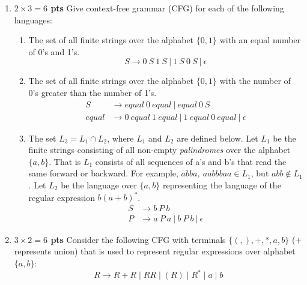 \documentclass[10pt]{article}
\newcommand {\pts}[1]{{\bf #1 pts}}
\begin{document}
\begin{enumerate}

\item  \pts{$2\times 3= 6$} Give context-free grammar (CFG) for each of the following languages:
    \begin{enumerate}
           \item The set of all finite strings over the alphabet $\{0,1\}$ with an equal number of 0's and 1's.
            \[
            S \rightarrow 0\ S\ 1\ S\ |\ 1\ S\ 0\ S\ |\  \epsilon
            \]
           \item The set of all finite strings over the alphabet $\{0,1\}$ with the number of 0's greater than the number of 1's.
           \begin{align*}
               S       &\rightarrow equal\ 0\ equal\ |\  equal\ 0\ S\\
               equal   &\rightarrow 0\ equal\ 1\ equal\
                        |\ 1\ equal\ 0\ equal\
                        |\ \epsilon
           \end{align*}
           \item The set $L_3=L_1\cap L_2$, where $L_1$ and $L_2$ are defined below.
           Let $L_1$ be the finite strings consisting of all non-empty \emph{palindromes} over the alphabet $\{a,b\}$. That is $L_1$
           consists of all sequences of a's and b's that read the same forward or backward. For example, $abba,~aabbbaa\in L_1$, but $abb\not\in L_1$.
           Let $L_2$ be the language over  $\{a,b\}$ representing the language of the regular expression $b(a+b)^\ast$.
           \begin{align*}
               S    &\rightarrow b\ P\ b \\
               P    &\rightarrow a\ P\ a\ |\ b\ P\ b\ |\ \epsilon
           \end{align*}
    \end{enumerate}

\newpage

\item \pts{$3\times 2= 6$} Consider the following CFG with terminals $\{(,),+,*,a,b\}$ ($+$ represents union) that is used to represent
regular expressions over alphabet $\{a, b\}$:
\[R\rightarrow R+R \mid RR\mid (R)\mid R^\ast \mid a\mid b\]


\end{enumerate}
\end{document}
